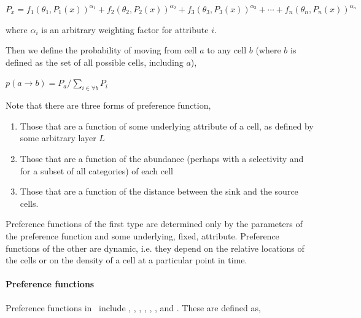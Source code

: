 $P_x=f_1(\theta_1,P_1(x))^{\alpha_1} + f_2(\theta_2,P_2(x))^{\alpha_2} + f_3(\theta_3,P_3(x))^{\alpha_3} + \cdots + f_n(\theta_n,P_n(x))^{\alpha_n}$

where $\alpha_i$ is an arbitrary weighting factor for attribute $i$.

Then we define the probability of moving from cell $a$ to any cell $b$ (where $b$ is defined as the set of all possible cells, including $a$),

$p(a\rightarrow b) = {P_a} / {\sum_{i \in \forall b}P_i}$

Note that there are three forms of preference function,
\begin{enumerate}
\item Those that are a function of some underlying attribute of a cell, as defined by some arbitrary layer $L$
\item Those that are a function of the abundance (perhaps with a selectivity and for a subset of all categories) of each cell
\item Those that are a function of the distance between the sink and the source cells. 
\end{enumerate} 

Preference functions of the first type are determined only by the parameters of the preference function and some underlying, fixed, attribute. Preference functions of the other are dynamic, i.e. they depend on the relative locations of the cells or on the density of a cell at a particular point in time.

\paragraph{Preference functions}

Preference functions in \SPM\ include , , , , , , and . These are defined as,

